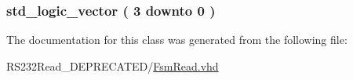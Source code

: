 \subsubsection[{Qp}]{ {\bfseries \textcolor{comment}{std\+\_\+logic\+\_\+vector}\textcolor{vhdlchar}{ }\textcolor{vhdlchar}{(}\textcolor{vhdlchar}{ }\textcolor{vhdlchar}{ } \textcolor{vhdldigit}{3} \textcolor{vhdlchar}{ }\textcolor{keywordflow}{downto}\textcolor{vhdlchar}{ }\textcolor{vhdlchar}{ } \textcolor{vhdldigit}{0} \textcolor{vhdlchar}{ }\textcolor{vhdlchar}{)}\textcolor{vhdlchar}{ }} \hspace{0.3cm}{\ttfamily [Signal]}}\label{class_fsm_read_1_1simple_a1374ca621da8c3ce3b11dc3a52dec0cf}


The documentation for this class was generated from the following file\+:\begin{DoxyCompactItemize}
\item 
R\+S232\+Read\+\_\+\+D\+E\+P\+R\+E\+C\+A\+T\+E\+D/\hyperlink{_d_e_p_r_e_c_a_t_e_d_2_fsm_read_8vhd}{Fsm\+Read.\+vhd}\end{DoxyCompactItemize}
